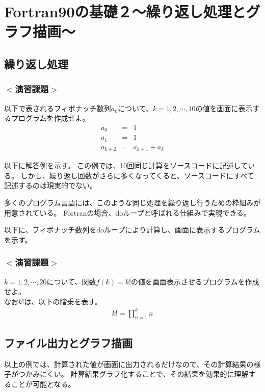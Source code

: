 \chapter{Fortran90の基礎２〜繰り返し処理とグラフ描画〜}
\section{繰り返し処理}
\subsection*{$<$演習課題$>$}
以下で表されるフィボナッチ数列$a_k$について、$k=1,2, \cdots, 10$の値を画面に表示するプログラムを作成せよ。 \\
\begin{eqnarray}
a_0 &=& 1 \\
a_1 &=& 1 \\
a_{k+2} &=& a_{k+1} + a_k
\end{eqnarray}

以下に解答例を示す。
この例では、10回同じ計算をソースコードに記述している。
しかし、繰り返し回数がさらに多くなってくると、ソースコードにすべて記述するのは現実的でない。

多くのプログラム言語には、このような同じ処理を繰り返し行うための枠組みが用意されている。
Fortranの場合、{\ttfamily do}ループと呼ばれる仕組みで実現できる。

以下に、フィボナッチ数列を{\ttfamily do}ループにより計算し、画面に表示するプログラムを示す。



\subsection*{$<$演習課題$>$}
$k=1,2, \cdots, 20$について、関数$f(k) = k!$の値を画面表示させるプログラムを作成せよ。\\
なお$k!$は、以下の階乗を表す。
\begin{eqnarray}
k! = \prod_{n=1}^{k} n
\end{eqnarray}

%

\section{ファイル出力とグラフ描画}
以上の例では、計算された値が画面に出力されるだけなので、その計算結果の様子がつかみにくい。
計算結果グラフ化することで、その結果を効果的に理解することが可能となる。

